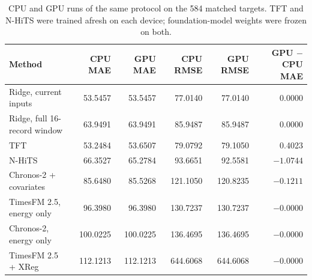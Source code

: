 \begin{table}[!htbp]\centering\footnotesize
\caption{CPU and GPU runs of the same protocol on the 584 matched targets. TFT and N-HiTS were trained afresh on each device; foundation-model weights were frozen on both.}\label{tab:s_cpu_gpu}
\begin{tabular}{@{}lrrrrr@{}}\toprule
Method & CPU MAE & GPU MAE & CPU RMSE & GPU RMSE & GPU $-$ CPU MAE \\\midrule
Ridge, current inputs & 53.5457 & 53.5457 & 77.0140 & 77.0140 & 0.0000 \\
Ridge, full 16-record window & 63.9491 & 63.9491 & 85.9487 & 85.9487 & 0.0000 \\
TFT & 53.2484 & 53.6507 & 79.0792 & 79.1050 & 0.4023 \\
N-HiTS & 66.3527 & 65.2784 & 93.6651 & 92.5581 & $-1.0744$ \\
Chronos-2 + covariates & 85.6480 & 85.5268 & 121.1050 & 120.8235 & $-0.1211$ \\
TimesFM 2.5, energy only & 96.3980 & 96.3980 & 130.7237 & 130.7237 & $-0.0000$ \\
Chronos-2, energy only & 100.0225 & 100.0225 & 136.4695 & 136.4695 & $-0.0000$ \\
TimesFM 2.5 + XReg & 112.1213 & 112.1213 & 644.6068 & 644.6068 & $-0.0000$ \\
\bottomrule
\end{tabular}
\end{table}
